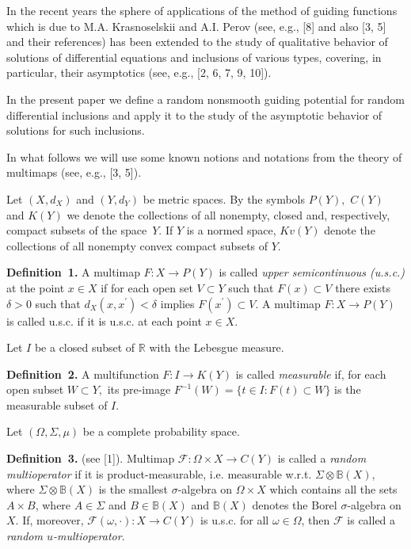
\vzmscaption

In the recent years the sphere of applications of the method of guiding functions which is due to M.A. Krasnoselskii and A.I. Perov (see, e.g., [8] and also [3, 5] and their references) has been extended to the study of qualitative behavior of solutions of differential equations and inclusions of various types, covering, in particular, their asymptotics (see, e.g., [2, 6, 7, 9, 10]).

In the present paper we define a random nonsmooth guiding potential for random differential inclusions and apply it to the study of the asymptotic behavior of solutions for such inclusions.

In what follows we will use some known notions and notati\-ons from the theory of multimaps (see, e.g., [3, 5]).

Let $(X,d_X)$ and $(Y,d_Y)$ be metric spaces. By the symbols $P(Y),$ $C(Y)$ and $K(Y)$ we denote the collections of all nonempty, closed and, respectively, compact subsets of the \lb space~$Y$. If $Y$ is a normed space, $Kv(Y)$ denote the collections of all nonempty convex compact subsets of $Y.$

\textbf{Definition~1.}
A multimap $F:X \to P(Y)$ is called {\it upper semicontinuous (u.s.c.)} at the point $x\in X$ if for each open set $V \subset Y$ such that $F(x) \subset V$ there exists $\delta >0$ such that $d_X(x,x^\prime)<\delta$ implies $F(x^\prime)\subset V.$ A multimap $F:X \to P(Y)$ is called u.s.c. if it is u.s.c. at each point $x\in X.$

Let $I$ be a closed subset of $\mathbb{R}$ with the Lebesgue measure.

\textbf{Definition~2.}
A multifunction $F:I \to K(Y)$ is called {\it measurable} if, for each open subset $W \subset Y,$ its pre-image \linebreak
$F^{-1}(W)=\{t\in I:F(t)\subset W\}$ is the measurable subset of $I$.

Let $(\Omega,\Sigma,\mu)$ be a complete probability space.

\textbf{Definition~3.} (see [1]). Multimap $\mathcal{F}\colon\Omega\times X\to C(Y)$ is called a {\it random multioperator} if it is product-measurable, i.e. measurable w.r.t. $\Sigma\otimes\mathbb{B}(X)$, where $\Sigma\otimes\mathbb{B}(X)$ is the smallest
$\sigma$-algebra on $\Omega\times X$ which contains all the sets $A\times B$, where $A\in\Sigma$ and $B\in\mathbb{B}(X)$ and
$\mathbb{B}(X)$ denotes the Borel $\sigma$-algebra on $X$. If, moreover, $\mathcal{F}(\omega,\cdot)\colon X\to C(Y)$ is u.s.c. for all
$\omega\in\Omega$, then $\mathcal{F}$ is called a {\it random $u$-multioperator}.

